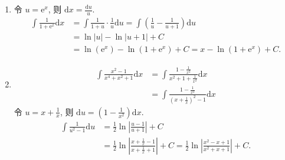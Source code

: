 \begin{solution}
    \begin{enumerate}
        \item 令 $u = \mathrm{e}^x$, 则 $\mathrm{d}x = \frac{\mathrm{d}u}{u}$.
              \begin{align*}
                  \int \frac{1}{1 + \mathrm{e}^x} \mathrm{d}x & = \int \frac{1}{1 + u} \cdot \frac{1}{u} \mathrm{d}u = \int \left(\frac{1}{u} - \frac{1}{u + 1}\right) \mathrm{d}u \\
                                                              & = \ln|u| - \ln|u + 1| + C                                                                                          \\
                                                              & = \ln(\mathrm{e}^x) - \ln(1 + \mathrm{e}^x) + C = x - \ln(1 + \mathrm{e}^x) + C.
              \end{align*}

        \item \begin{align*}
                  \int \frac{x^2 - 1}{x^4 + x^2 + 1} \mathrm{d}x & = \int \frac{1 - \frac{1}{x^2}}{x^2 + 1 + \frac{1}{x^2}} \mathrm{d}x \\
                                                                 & = \int \frac{1 - \frac{1}{x^2}}{(x + \frac{1}{x})^2 - 1} \mathrm{d}x
              \end{align*}
              令 $u = x + \frac{1}{x}$, 则 $\mathrm{d}u = (1 - \frac{1}{x^2}) \mathrm{d}x$.
              \begin{align*}
                  \int \frac{1}{u^2 - 1} \mathrm{d}u & = \frac{1}{2} \ln\left|\frac{u - 1}{u + 1}\right| + C                                                                                                \\
                                                     & = \frac{1}{2} \ln\left|\frac{x + \frac{1}{x} - 1}{x + \frac{1}{x} + 1}\right| + C = \frac{1}{2} \ln\left|\frac{x^2 - x + 1}{x^2 + x + 1}\right| + C.
              \end{align*}


\end{enumerate}
\end{solution}
